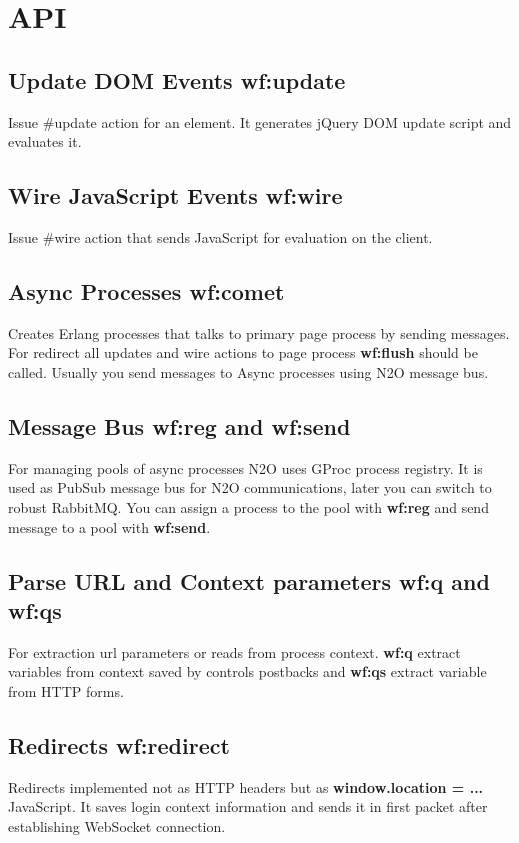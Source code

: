 \section{API}

\subsection{Update DOM Events \bf{wf:update}}
Issue \#update{} action for an element.
It generates jQuery DOM update script and evaluates it.

\subsection{Wire JavaScript Events \bf{wf:wire}}
Issue \#wire{} action that sends JavaScript for evaluation on the client.

\subsection{Async Processes \bf{wf:comet}}
Creates Erlang processes that talks to primary page process by sending messages.
For redirect all updates and wire actions to page process {\bf wf:flush} should be called.
Usually you send messages to Async processes using N2O message bus.

\subsection{Message Bus {\bf wf:reg} and {\bf wf:send}}
For managing pools of async processes N2O uses GProc process registry.
It is used as PubSub message bus for N2O communications, later you can switch to robust RabbitMQ.
You can assign a process to the pool with {\bf wf:reg} and send message to a pool with {\bf wf:send}.

\subsection{Parse URL and Context parameters {\bf wf:q} and {\bf wf:qs}}
For extraction url parameters or reads from process context. {\bf wf:q} extract variables
from context saved by controls postbacks and {\bf wf:qs} extract variable from HTTP forms.

\subsection{Redirects {\bf wf:redirect}}
Redirects implemented not as HTTP headers but as {\bf window.location = ...} JavaScript.
It saves login context information and sends it in first packet after establishing WebSocket connection.

